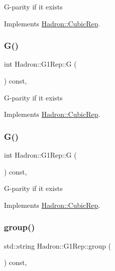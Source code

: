 G-\/parity if it exists 

Implements \mbox{\hyperlink{structHadron_1_1CubicRep_a52104e43266d1614c00bbd1c3b395458}{Hadron\+::\+Cubic\+Rep}}.

\mbox{\label{structHadron_1_1G1Rep_aef0192ff8fe84fbb599253d0b499cc48}} 
\subsubsection{\texorpdfstring{G()}{G()}\hspace{0.1cm}{\footnotesize\ttfamily [2/3]}}
{\footnotesize\ttfamily int Hadron\+::\+G1\+Rep\+::G (\begin{DoxyParamCaption}{ }\end{DoxyParamCaption}) const\hspace{0.3cm}{\ttfamily [inline]}, {\ttfamily [virtual]}}

G-\/parity if it exists 

Implements \mbox{\hyperlink{structHadron_1_1CubicRep_a52104e43266d1614c00bbd1c3b395458}{Hadron\+::\+Cubic\+Rep}}.

\mbox{\label{structHadron_1_1G1Rep_aef0192ff8fe84fbb599253d0b499cc48}} 
\subsubsection{\texorpdfstring{G()}{G()}\hspace{0.1cm}{\footnotesize\ttfamily [3/3]}}
{\footnotesize\ttfamily int Hadron\+::\+G1\+Rep\+::G (\begin{DoxyParamCaption}{ }\end{DoxyParamCaption}) const\hspace{0.3cm}{\ttfamily [inline]}, {\ttfamily [virtual]}}

G-\/parity if it exists 

Implements \mbox{\hyperlink{structHadron_1_1CubicRep_a52104e43266d1614c00bbd1c3b395458}{Hadron\+::\+Cubic\+Rep}}.

\mbox{\label{structHadron_1_1G1Rep_a46fbef350073111e5d5d23ae1dc9832d}} 
\subsubsection{\texorpdfstring{group()}{group()}\hspace{0.1cm}{\footnotesize\ttfamily [1/3]}}
{\footnotesize\ttfamily std\+::string Hadron\+::\+G1\+Rep\+::group (\begin{DoxyParamCaption}{ }\end{DoxyParamCaption}) const\hspace{0.3cm}{\ttfamily [inline]}, {\ttfamily [virtual]}}

